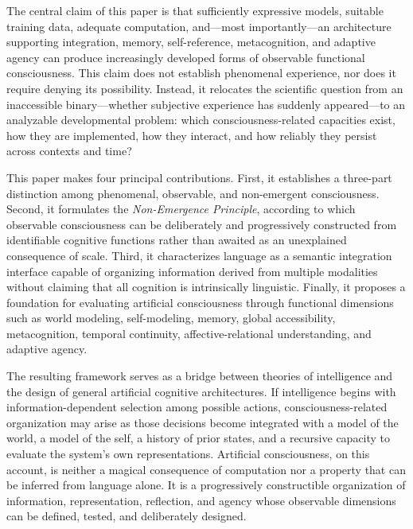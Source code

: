 The central claim of this paper is that sufficiently expressive models, suitable training data, adequate computation, and---most importantly---an architecture supporting integration, memory, self-reference, metacognition, and adaptive agency can produce increasingly developed forms of observable functional consciousness. This claim does not establish phenomenal experience, nor does it require denying its possibility. Instead, it relocates the scientific question from an inaccessible binary---whether subjective experience has suddenly appeared---to an analyzable developmental problem: which consciousness-related capacities exist, how they are implemented, how they interact, and how reliably they persist across contexts and time?

This paper makes four principal contributions. First, it establishes a three-part distinction among phenomenal, observable, and non-emergent consciousness. Second, it formulates the \emph{Non-Emergence Principle}, according to which observable consciousness can be deliberately and progressively constructed from identifiable cognitive functions rather than awaited as an unexplained consequence of scale. Third, it characterizes language as a semantic integration interface capable of organizing information derived from multiple modalities without claiming that all cognition is intrinsically linguistic. Finally, it proposes a foundation for evaluating artificial consciousness through functional dimensions such as world modeling, self-modeling, memory, global accessibility, metacognition, temporal continuity, affective-relational understanding, and adaptive agency.

The resulting framework serves as a bridge between theories of intelligence and the design of general artificial cognitive architectures. If intelligence begins with information-dependent selection among possible actions, consciousness-related organization may arise as those decisions become integrated with a model of the world, a model of the self, a history of prior states, and a recursive capacity to evaluate the system's own representations. Artificial consciousness, on this account, is neither a magical consequence of computation nor a property that can be inferred from language alone. It is a progressively constructible organization of information, representation, reflection, and agency whose observable dimensions can be defined, tested, and deliberately designed.

